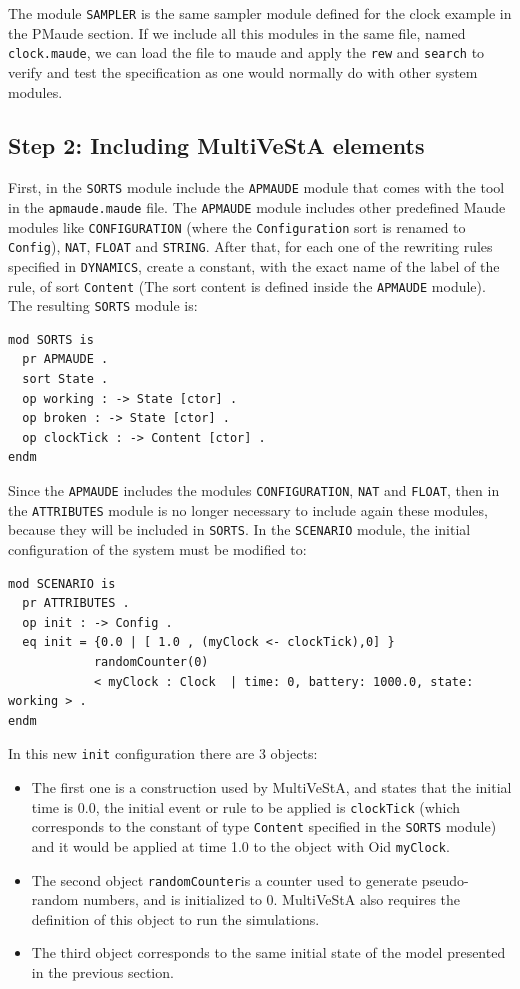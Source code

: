The module \texttt{SAMPLER} is the same sampler module defined for the clock example in the PMaude section. If we include all this modules in the same file, named \texttt{clock.maude}, we can load the file to maude and apply the \texttt{rew} and \texttt{search} to verify and test the specification as one would normally do with other system modules. 

\subsection{Step 2: Including MultiVeStA elements}
First, in the \texttt{SORTS} module include the \texttt{APMAUDE} module that comes with the tool in the \texttt{apmaude.maude} file. The \texttt{APMAUDE} module includes other predefined Maude modules like \texttt{CONFIGURATION} (where the \texttt{Configuration} sort is renamed to \texttt{Config}), \texttt{NAT}, \texttt{FLOAT} and \texttt{STRING}. After that, for each one of the rewriting rules specified in \texttt{DYNAMICS}, create a constant, with the exact name of the label of the rule, of sort \texttt{Content} (The sort content is defined inside the \texttt{APMAUDE} module). The resulting \texttt{SORTS} module is:
\begin{lstlisting}
mod SORTS is
  pr APMAUDE .
  sort State .
  op working : -> State [ctor] .
  op broken : -> State [ctor] .
  op clockTick : -> Content [ctor] .
endm
\end{lstlisting}
Since the \texttt{APMAUDE} includes the modules \texttt{CONFIGURATION}, \texttt{NAT} and \texttt{FLOAT}, then in the \texttt{ATTRIBUTES} module is no longer necessary to include again these modules, because they will be included in \texttt{SORTS}. In the \texttt{SCENARIO} module, the initial configuration of the system must be modified to:
\begin{lstlisting}
mod SCENARIO is
  pr ATTRIBUTES .
  op init : -> Config .
  eq init = {0.0 | [ 1.0 , (myClock <- clockTick),0] }
            randomCounter(0)
            < myClock : Clock  | time: 0, battery: 1000.0, state: working > . 
endm
\end{lstlisting}
In this new \texttt{init} configuration there are 3 objects:
\begin{itemize}
    \item The first one is a construction used by MultiVeStA, and states that the initial time is 0.0, the initial event or rule to be applied is \texttt{clockTick} (which corresponds to the constant of type \texttt{Content} specified in the \texttt{SORTS} module) and it would be applied at time 1.0 to the object with Oid \texttt{myClock}.
    \item The second object \texttt{randomCounter}is a counter used to generate pseudo-random numbers, and is initialized to 0. MultiVeStA also requires the definition of this object to run the simulations.
    \item The third object corresponds to the same initial state of the model presented in the previous section.
\end{itemize}
